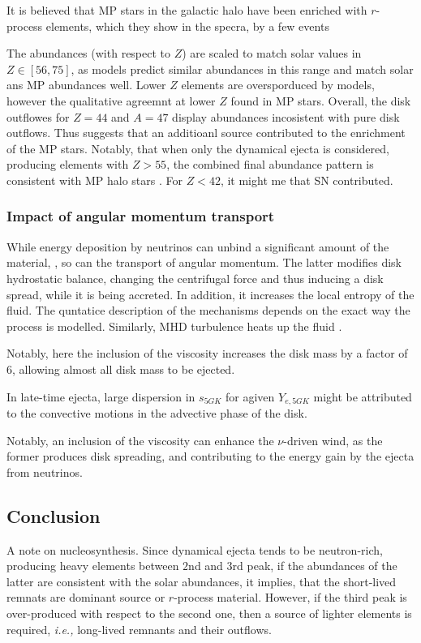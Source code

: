It is believed that \ac{MP} stars in the galactic halo have been enriched with $r$-process elements, which they show in the specra, by a few events \cite{(Cowan et al., 1999)}

The abundances (with respect to $Z$) are scaled to match solar values in $Z\in[56,75]$, as models predict similar abundances in this range and match solar ans \ac{MP} abundances well. 
Lower $Z$ elements are oversporduced by models, however the qualitative agreemnt at lower $Z$ found in MP stars.
Overall, the disk outflowes for $Z=44$ and $A=47$ display abundances incosistent with pure disk outflows. Thus suggests that an additioanl source contributed to the enrichment of the MP stars.
Notably, that when only the dynamical ejecta is considered, producing elements with $Z>55$, the combined final abundance pattern is consistent with MP halo stars \cite{(cf. Just et al., 2015).}. For $Z<42$, it might me that SN contributed. 


\subsubsection{Impact of angular momentum transport}

While energy deposition by neutrinos can unbind a significant amount of the material, \cite{Ruffert et al., 1997}, so can the transport of angular momentum. The latter modifies disk hydrostatic balance, changing the centrifugal force and thus inducing a disk spread, while it is being accreted. In addition, it increases the local entropy of the fluid. The quntatice description of the mechanisms depends on the exact way the process is modelled. Similarly, MHD turbulence heats up the fluid \cite{Hirose et al., 2006}. 

Notably, here the inclusion of the viscosity increases the disk mass by a factor of $6$, allowing almost all disk mass to be ejected. 

In late-time ejecta, large dispersion in $s_{5GK}$ for agiven $Y_{e,5GK}$ might be attributed to the convective motions in the advective phase of the disk. 

Notably, an inclusion of the viscosity can enhance the $\nu$-driven wind, as the former produces disk spreading, and contributing to the energy gain by the ejecta from neutrinos. 


\subsection{Conclusion}

A note on nucleosynthesis. Since dynamical ejecta tends to be neutron-rich, producing heavy elements between $2$nd and $3$rd peak, if the abundances of the latter are consistent with the solar abundances, it implies, that the short-lived remnats are dominant source or $r$-process material. However, if the third peak is over-produced with respect to the second one, then a source of lighter elements is required, \textit{i.e.,} long-lived remnants and their outflows. 